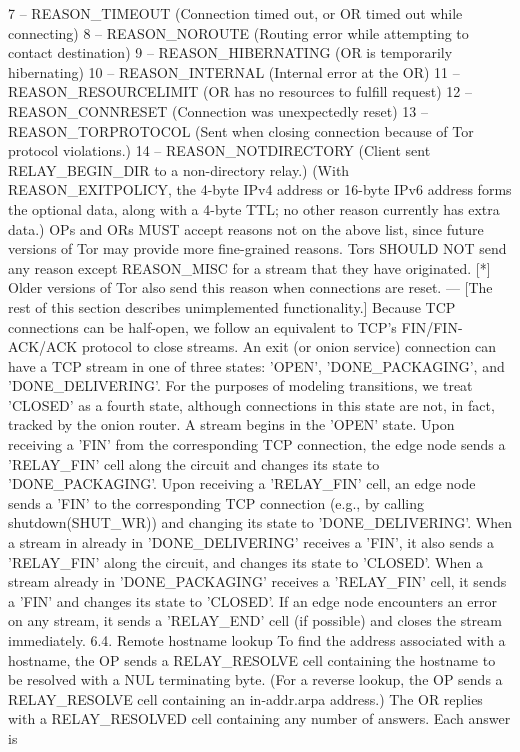 7 -- REASON_TIMEOUT (Connection timed out, or OR timed out
while connecting)
8 -- REASON_NOROUTE (Routing error while attempting to
contact destination)
9 -- REASON_HIBERNATING (OR is temporarily hibernating)
10 -- REASON_INTERNAL (Internal error at the OR)
11 -- REASON_RESOURCELIMIT (OR has no resources to fulfill request)
12 -- REASON_CONNRESET (Connection was unexpectedly reset)
13 -- REASON_TORPROTOCOL (Sent when closing connection because of
Tor protocol violations.)
14 -- REASON_NOTDIRECTORY (Client sent RELAY_BEGIN_DIR to a
non-directory relay.)
(With REASON_EXITPOLICY, the 4-byte IPv4 address or 16-byte IPv6 address
forms the optional data, along with a 4-byte TTL; no other reason
currently has extra data.)
OPs and ORs MUST accept reasons not on the above list, since future
versions of Tor may provide more fine-grained reasons.
Tors SHOULD NOT send any reason except REASON_MISC for a stream that they
have originated.
[*] Older versions of Tor also send this reason when connections are
reset.
--- [The rest of this section describes unimplemented functionality.]
Because TCP connections can be half-open, we follow an equivalent
to TCP's FIN/FIN-ACK/ACK protocol to close streams.
An exit (or onion service) connection can have a TCP stream in one of
three states: 'OPEN', 'DONE_PACKAGING', and 'DONE_DELIVERING'. For the
purposes of modeling transitions, we treat 'CLOSED' as a fourth state,
although connections in this state are not, in fact, tracked by the
onion router.
A stream begins in the 'OPEN' state. Upon receiving a 'FIN' from
the corresponding TCP connection, the edge node sends a 'RELAY_FIN'
cell along the circuit and changes its state to 'DONE_PACKAGING'.
Upon receiving a 'RELAY_FIN' cell, an edge node sends a 'FIN' to
the corresponding TCP connection (e.g., by calling
shutdown(SHUT_WR)) and changing its state to 'DONE_DELIVERING'.
When a stream in already in 'DONE_DELIVERING' receives a 'FIN', it
also sends a 'RELAY_FIN' along the circuit, and changes its state
to 'CLOSED'. When a stream already in 'DONE_PACKAGING' receives a
'RELAY_FIN' cell, it sends a 'FIN' and changes its state to
'CLOSED'.
If an edge node encounters an error on any stream, it sends a
'RELAY_END' cell (if possible) and closes the stream immediately.
6.4. Remote hostname lookup
To find the address associated with a hostname, the OP sends a
RELAY_RESOLVE cell containing the hostname to be resolved with a NUL
terminating byte. (For a reverse lookup, the OP sends a RELAY_RESOLVE
cell containing an in-addr.arpa address.) The OR replies with a
RELAY_RESOLVED cell containing any number of answers. Each answer is
